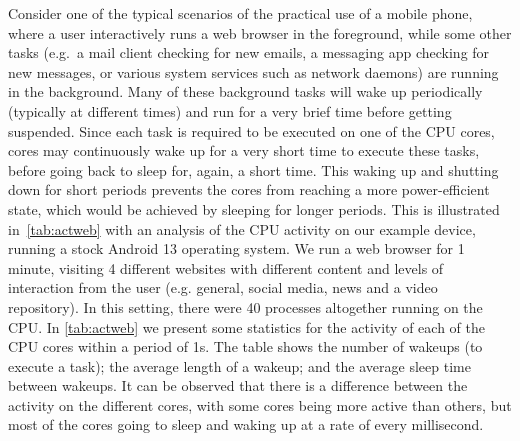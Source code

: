 \documentclass[conference]{IEEEtran}
\begin{document}
Consider one of the typical scenarios of the practical use of a mobile phone, where a user interactively runs a web browser in the foreground, while some other tasks (e.g.~a mail client checking for new emails, a messaging app checking for new messages, or various system services such as network daemons) are running in the background. Many of these background tasks will wake up periodically (typically at different times) and run for a very brief time before getting suspended. Since each task is required to be executed on one of the CPU cores, cores may continuously wake up for a very short time to execute these tasks, before going back to sleep for, again, a short time. This waking up and shutting down for short periods prevents the cores from reaching a more power-efficient state, which would be achieved by sleeping for longer periods. This is illustrated in~\cref{tab:actweb} with an analysis of the CPU activity on our example device, running a stock Android 13 operating system. We run a web browser for 1 minute, visiting 4 different websites with different content and levels of interaction from the user (e.g. general, social media, news and a video repository). In this setting, there were 40 processes altogether running on the CPU. In \cref{tab:actweb} we present some statistics for the activity of each of the CPU cores within a period of 1s. The table shows the number of wakeups (to execute a task); the average length of a wakeup; and the average sleep time between wakeups. It can be observed that there is a difference between the activity on the different cores, with some cores being more active than others, but most of the cores going to sleep and waking up at a rate of every millisecond. %


\end{document}
